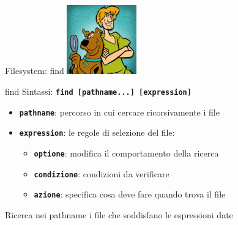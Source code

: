 \documentclass{beamer}
\begin{document}
    \begin{frame}{Filesystem: find}
        \centering
        \includegraphics[height=3cm, keepaspectratio]{images/scooby.jpg}

        \begin{block}{find}
            Sintassi: \texttt{\textbf{find [pathname...] [expression]}}

            \begin{itemize}
                \item \texttt{\textbf{pathname}}: percorso in cui cercare ricorsivamente i file
                \item \texttt{\textbf{expression}}: le regole di selezione del file:
                \begin{itemize}
                    \item \texttt{\textbf{optione}}: modifica il comportamento della ricerca
                    \item \texttt{\textbf{condizione}}: condizioni da verificare
                    \item \texttt{\textbf{azione}}: specifica cosa deve fare quando trova il file
                \end{itemize}
            \end{itemize}

            Ricerca nei pathname i file che soddisfano le espressioni date
        \end{block}
    \end{frame}
\end{document}
